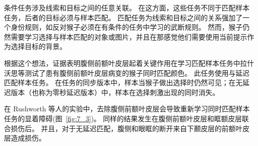 条件任务涉及线索和目标之间的任意关联。 
在这方面，这些任务不同于匹配样本任务，后者的目标必须与样本匹配。
匹配任务为线索和目标之间的关系强加了一个身份规则，如反对猴子必须在有条件的任务中学习的武断规则。 
然而，猴子仍然需要学习选择与样本匹配的对象或图片，并且在那感觉他们需要使用当前提示作为选择目标的背景。
\par


根据这个想法，证据表明腹侧前额叶皮层起着关键作用在学习匹配样本任务中拉什沃思等\cite{rushworth1997ventral}测试了患有腹侧前额叶皮层病变的猴子同时匹配颜色。 
此任务使用与延迟匹配样本任务。 
在任务的同步版本中，样本当猴子做出选择时仍然可见；在无延迟版本（也称为零秒延迟版本）中，样本在选择刺激出现的同时消失。
\par


在 Rushworth 等人的实验中，去除腹侧前额叶皮层会导致重新学习同时匹配样本任务的显着障碍(图~\ref{fig:7_3})。
同样的结果发生在腹侧前额叶皮层和眶额皮层联合损伤后\cite{bussey2001role}。
并且，对于无延迟匹配，腹侧和眼眶的断开来自下颞皮层的前额叶皮层造成损伤\cite{bussey2002interaction}。
\par


